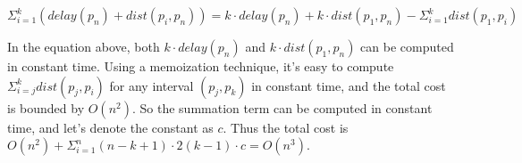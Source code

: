 \[
\Sigma_{i=1}^{k}(delay(p_n) + dist(p_i, p_n)) = k \cdot delay(p_n) + k \cdot dist(p_1, p_n) - \Sigma_{i=1}^{k}dist(p_1, p_i)
\]

In the equation above, both $k \cdot delay(p_n)$ and $k \cdot dist(p_1, p_n)$ can be computed in constant time. Using a memoization technique, it's easy to compute $\Sigma_{i=j}^{k}dist(p_j, p_i)$ for any interval $(p_j, p_k)$ in constant time, and the total cost is bounded by $O(n^2)$. So the summation term can be computed in constant time, and let's denote the constant as $c$. Thus the total cost is $O(n^2) + \Sigma_{i=1}^{n} (n - k + 1) \cdot 2(k - 1) \cdot c = O(n^3)$.